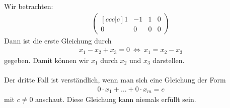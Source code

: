 Wir betrachten:
\begin{align*}
\begin{pmatrix}[ccc|c]
1& -1 & 1 & 0\\
0 & 0 & 0 &0
\end{pmatrix}
\end{align*}
Dann ist die erste Gleichung durch
\begin{align*}
x_1 -x_2 + x_3 = 0
\
\Leftrightarrow \
x_1 = x_2 -x_3
\end{align*}
gegeben. Damit können wir $x_1$ durch $x_2$ und $x_3$ darstellen.\\
\\
Der dritte Fall ist verständlich, wenn man sich eine Gleichung der Form
\begin{align*}
0 \cdot x_1 + \dots + 0 \cdot x_m = c 
\end{align*}
mit $c \neq 0$ anschaut.
Diese Gleichung kann niemals erfüllt sein.\\


